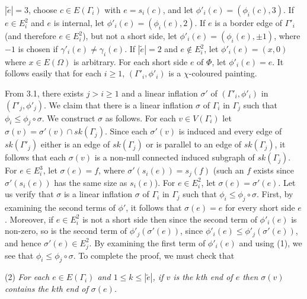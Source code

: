 \noindent $|\tilde{e}| = 3$, choose $c\in E(\Gamma_i)$ with $e = s_i(c)$, and let $\phi'_i(e) = (\phi_i(c),3)$. If $e\in E_i^2$ and $e$ is internal, let $\phi'_i(e) = (\phi_i(e),2)$. If $e$ is a border edge of $\Gamma'_i$ (and therefore $e\in E_i^2$), but not a short side, let $\phi'_i(e) = (\phi_i(e),\pm 1)$, where $-1$ is chosen if $\gamma'_i(e)\ne \gamma_i(e)$. If $|\tilde{e}| = 2$ and $e\notin E_i^2$, let $\phi'_i(e) = (x,0)$ where $x\in E(\Omega)$ is arbitrary. For each short side $e$ of $\Phi$, let $\phi'_i(e) = e$. It follows easily that for each $i\ge 1$, $(\Gamma'_i,\phi'_i)$ is a $\chi$-coloured painting.

From 3.1, there exists $j>i\ge 1$ and a linear inflation $\sigma'$ of $(\Gamma'_i,\phi'_i)$ in $(\Gamma'_j,\phi'_j)$. We claim that there is a linear inflation $\sigma$ of $\Gamma_i$ in $\Gamma_j$ such that $\phi_i\le \phi_j\circ \sigma$. We construct $\sigma$ as follows. For each $v\in V(\Gamma_i)$ let $\sigma(v) = \sigma'(v)\cap sk(\Gamma_j)$. Since each $\sigma'(v)$ is induced and every edge of $sk(\Gamma'_j)$ either is an edge of $sk(\Gamma_j)$ or is parallel to an edge of $sk(\Gamma_j)$, it follows that each $\sigma(v)$ is a non-null connected induced subgraph of $sk(\Gamma_j)$. For $e\in E_i^3$, let $\sigma(e) = f$, where $\sigma'(s_i(e)) = s_j(f)$ (such an $f$ exists since $\sigma'(s_i(e))$ has the same size as $s_i(e)$). For $e\in E_i^2$, let $\sigma(e) = \sigma'(e)$. Let us verify that $\sigma$ is a linear inflation $\sigma$ of $\Gamma_i$ in $\Gamma_j$ such that $\phi_i\le \phi_j\circ \sigma$. First, by examining the second terms of $\phi'$, it follows that $\sigma(e) = e$ for every short side $e$. Moreover, if $e\in E_i^2$ is not a short side then since the second term of $\phi'_i(e)$ is non-zero, so is the second term of $\phi'_j(\sigma'(e))$, since $\phi'_i(e)\le \phi'_j(\sigma'(e))$, and hence $\sigma'(e)\in E_j^2$. By examining the first term of $\phi'_i(e)$ and using (1), we see that $\phi_i\le \phi_j\circ \sigma$. To complete the proof, we must check that

\hspace*{12pt}(2) \textit{For each $e\in E(\Gamma_i)$ and $1\le k\le |\tilde{e}|$, if $v$ is the $k$th end of $e$ then $\sigma(v)$ contains the $k$th end of $\sigma(e)$.}

